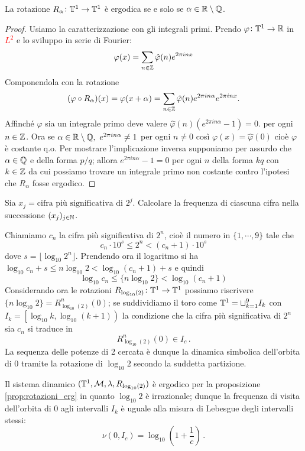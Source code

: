 \begin{proposition}\label{prop:rotazioni_erg}
    La rotazione $ R_\alpha \colon \mathbb{T}^1 \to \mathbb{T}^1 $ è ergodica se e solo se $ \alpha \in \mathbb{R} \setminus \mathbb{Q} $. 
\end{proposition}
\begin{proof}
    Usiamo la caratterizzazione con gli integrali primi. Prendo $ \varphi \colon \mathbb{T}^1 \to \mathbb{R} $ in \textcolor{red}{$ L^2 $} e lo sviluppo in serie di Fourier:
    \[
        \varphi(x) = \sum_{n \in \mathbb{Z}} \hat{\varphi}(n) e^{2\pi i n x}
    \]
    Componendola con la rotazione
    \[
        (\varphi \circ R_\alpha)(x) = \varphi(x + \alpha) = \sum_{n \in \mathbb{Z}} \hat{\varphi}(n) e^{2\pi i n \alpha} e^{2\pi i n x}.
    \]
    Affinché $ \varphi $ sia un integrale primo deve valere $ \hat{\varphi}(n) \left(e^{2\pi i n \alpha} - 1 \right) = 0. $ per ogni $ n \in \mathbb{Z} $.
    Ora se $ \alpha \in \mathbb{R} \setminus \mathbb{Q}, \ e^{2\pi i n \alpha} \neq 1 $ per ogni $ n \neq 0 $ così $ \varphi(x) = \hat{\varphi}(0) $ cioè $ \varphi $ è costante q.o. Per mostrare l'implicazione inversa supponiamo per assurdo che $ \alpha \in \mathbb{Q} $ e della forma $ p/q $; allora $ e^{2\pi i n \alpha} - 1 = 0 $ per ogni $ n $ della forma $ kq $ con $ k \in \mathbb{Z} $ da cui possiamo trovare un integrale primo non costante contro l'ipotesi che $ R_\alpha $ fosse ergodico.
\end{proof}

\begin{exercise}\label{ex:potenze_di_due_cancro}
    Sia $ x_j = \text{cifra più significativa di } 2^j $. Calcolare la frequenza di ciascuna cifra nella successione $ (x_j)_{j\in\mathbb{N}} $.
\end{exercise}
\begin{solution}
    Chiamiamo $ c_n $ la cifra più significativa di $ 2^n $, cioè il numero in $ \{1, \cdots, 9\} $ tale che
    \[ c_n \cdot 10^s \leq 2^n < (c_n+1) \cdot 10^s \]
    dove $ s = \lfloor \log_{10} 2^n \rfloor $. Prendendo ora il logaritmo si ha $ \log_{10}c_n + s \leq n\log_{10}2 < \log_{10}(c_n+1) + s $ e quindi
    \[ \log_{10}c_n \leq \{n\log_{10}2\} < \log_{10}(c_n+1) \]
    Considerando ora le rotazioni $ R_{\log_{10}(2)} \colon \mathbb{T}^1\to\mathbb{T}^1 $ possiamo riscrivere $ \{ n\log_{10}2 \} = R^n_{\log_{10}(2)}(0) $;
    se suddividiamo il toro come $ \mathbb{T}^1 = \sqcup_{k=1}^9 I_k $ con $ I_k = \left[\log_{10}k,\log_{10}(k+1)\right) $ la condizione che la cifra più significativa di $ 2^n $ sia $ c_n $ si traduce in
    \[ R^n_{\log_{10}(2)}(0) \in I_c \, . \]
    La sequenza delle potenze di 2 cercata è dunque la dinamica simbolica dell'orbita di 0 tramite la rotazione di $ \log_{10}2 $ secondo la suddetta partizione.

    Il sistema dinamico $ (\mathbb{T}^1, \mathcal{M}, \lambda, R_{\log_{10}(2)}) $ è ergodico per la proposizione \ref{prop:rotazioni_erg} in quanto $ \log_{10}2 $ è irrazionale; dunque la frequenza di visita dell'orbita di 0 agli intervalli $ I_k $ è uguale alla misura di Lebesgue degli intervalli stessi:
    \[ \nu(0,I_c) = \log_{10}\left(1+\frac{1}{c}\right) \, . \]
\end{solution}

